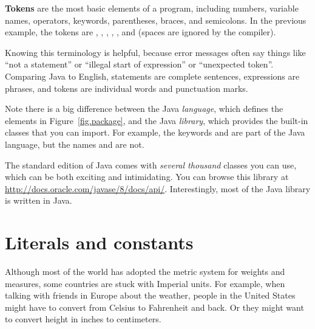 {\bf Tokens} are the most basic elements of a program, including numbers, variable names, operators, keywords, parentheses, braces, and semicolons.
In the previous example, the tokens are , \java{=}, , \java{/}, , and \java{;} (spaces are ignored by the compiler).


Knowing this terminology is helpful, because error messages often say things like ``not a statement'' or ``illegal start of expression'' or ``unexpected token''.
Comparing Java to English, statements are complete sentences, expressions are phrases, and tokens are individual words and punctuation marks.


Note there is a big difference between the Java {\em language}, which defines the elements in Figure~\ref{fig.package}, and the Java {\em library}, which provides the built-in classes that you can import.
For example, the keywords  and  are part of the Java language, but the names  and  are not.

The standard edition of Java comes with {\em several thousand} classes you can use, which can be both exciting and intimidating.
You can browse this library at \url{http://docs.oracle.com/javase/8/docs/api/}.
Interestingly, most of the Java library is written in Java.


\section{Literals and constants}

Although most of the world has adopted the metric system for weights and measures, some countries are stuck with Imperial units.
For example, when talking with friends in Europe about the weather, people in the United States might have to convert from Celsius to Fahrenheit and back.
Or they might want to convert height in inches to centimeters.


